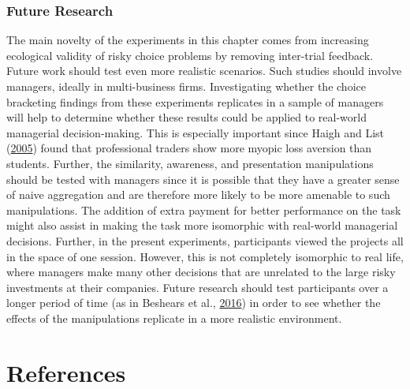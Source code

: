 \documentclass[
  english,
  man, donotrepeattitle,floatsintext]{apa7}
\theoremstyle{definition}
\theoremstyle{definition}
\theoremstyle{definition}
\theoremstyle{definition}
\theoremstyle{remark}
\begin{document}
\hypertarget{future-research}{%
\subsubsection{Future Research}\label{future-research}}

The main novelty of the experiments in this chapter comes from increasing
ecological validity of risky choice problems by removing inter-trial feedback.
Future work should test even more realistic scenarios. Such studies should
involve managers, ideally in multi-business firms. Investigating whether the
choice bracketing findings from these experiments replicates in a sample of
managers will help to determine whether these results could be applied to
real-world managerial decision-making. This is especially important since
Haigh and List (\protect\hyperlink{ref-haigh2005}{2005}) found that professional traders show more myopic loss aversion than
students. Further, the similarity, awareness, and presentation manipulations
should be tested with managers since it is possible that they have a greater
sense of naive aggregation and are therefore more likely to be more amenable to
such manipulations. The addition of extra payment for better performance on the
task might also assist in making the task more isomorphic with real-world
managerial decisions. Further, in the present experiments, participants viewed
the projects all in the space of one session. However, this is not completely
isomorphic to real life, where managers make many other decisions that are
unrelated to the large risky investments at their companies. Future research
should test participants over a longer period of time (as in Beshears et al., \protect\hyperlink{ref-beshears2016}{2016}) in
order to see whether the effects of the manipulations replicate in a more
realistic environment.

\newpage

\newpage

\hypertarget{references}{%
\section{References}\label{references}}

\setlength{\parindent}{-0.5in}
\setlength{\leftskip}{0.5in}
\end{document}
